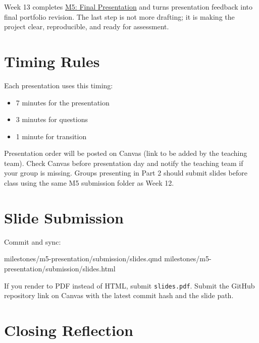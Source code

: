 \documentclass[
  letterpaper,
  DIV=11,
  numbers=noendperiod,
  oneside]{scrreprt}
\newenvironment{Shaded}{\begin{snugshade}}{\end{snugshade}}
\newcommand{\NormalTok}[1]{\textcolor[rgb]{0.00,0.23,0.31}{#1}}
\providecommand{\tightlist}{%
  \setlength{\itemsep}{0pt}\setlength{\parskip}{0pt}}
\begin{document}

Week 13 completes \href{../../milestones/m5-presentation/README.md}{M5:
Final Presentation} and turns presentation feedback into final portfolio
revision. The last step is not more drafting; it is making the project
clear, reproducible, and ready for assessment.

\section*{Timing Rules}\label{timing-rules-1}


Each presentation uses this timing:

\begin{itemize}
\tightlist
\item
  7 minutes for the presentation
\item
  3 minutes for questions
\item
  1 minute for transition
\end{itemize}

Presentation order will be posted on Canvas (link to be added by the
teaching team). Check Canvas before presentation day and notify the
teaching team if your group is missing. Groups presenting in Part 2
should submit slides before class using the same M5 submission folder as
Week 12.

\section*{Slide Submission}\label{slide-submission-1}


Commit and sync:

\begin{Shaded}
\begin{Highlighting}[numbers=left,,]
\NormalTok{milestones/m5{-}presentation/submission/slides.qmd}
\NormalTok{milestones/m5{-}presentation/submission/slides.html}
\end{Highlighting}
\end{Shaded}

If you render to PDF instead of HTML, submit \texttt{slides.pdf}. Submit
the GitHub repository link on Canvas with the latest commit hash and the
slide path.

\section*{Closing Reflection}\label{closing-reflection}
\end{document}
